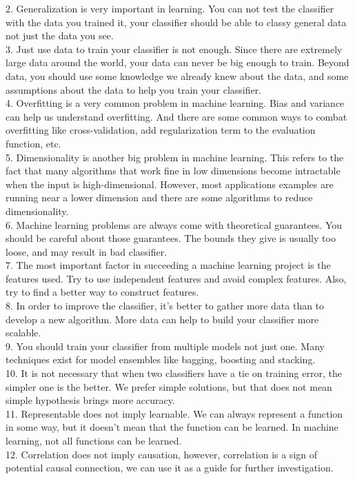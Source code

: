 \documentclass[11pt,a4paper,fleqn]{article}
\begin{document}
2. Generalization is very important in learning. You can not test the classifier with the data you trained it, your classifier should be able to classy general data not just the data you see. \\
3. Just use data to train your classifier is not enough. Since there are extremely large data around the world, your data can never be big enough to train. Beyond data, you should use some knowledge we already knew about the data, and some assumptions about the data to help you train your classifier.\\
4. Overfitting is a very common problem in machine learning. Bias and variance can help us understand overfitting. And there are some common ways to combat overfitting like cross-validation, add regularization term to the evaluation function, etc. \\
5. Dimensionality is another big problem in machine learning. This refers to the fact that many algorithms that work fine in low dimensions become intractable when the input is high-dimensional. However, most applications examples are running near a lower dimension and there are some algorithms to reduce dimensionality.\\
6. Machine learning problems are always come with theoretical guarantees. You should be careful about those guarantees. The bounds they give is usually too loose, and may result in bad classifier.\\
7. The most important factor in succeeding a machine learning project is the features used. Try to use independent features and avoid complex features. Also, try to find a better way to construct features.\\
8. In order to improve the classifier, it's better to gather more data than to develop a new algorithm. More data can help to build your classifier more scalable.\\
9. You should train your classifier from multiple models not just one. Many techniques exist for model ensembles like bagging, boosting and stacking.\\
10. It is not necessary that when two classifiers have a tie on training error, the simpler one is the better. We prefer simple solutions, but that does not mean simple hypothesis brings more accuracy.\\
11. Representable does not imply learnable. We can always represent a function in some way, but it doesn't mean that the function can be learned. In machine learning, not all functions can be learned.\\
12. Correlation does not imply causation, however, correlation is a sign of potential causal connection, we can use it as a guide for further investigation.\\
\end{document}
